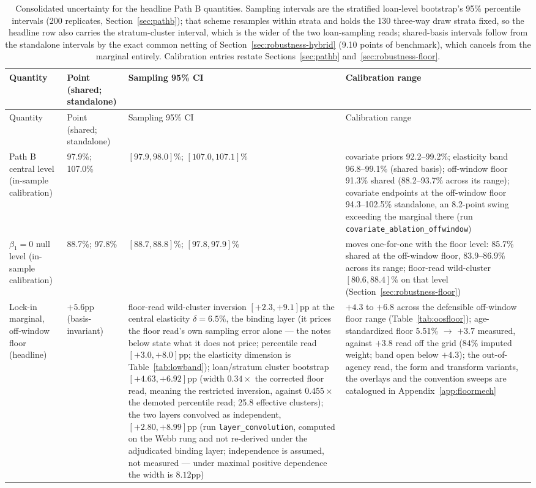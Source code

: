 {\footnotesize
\begin{longtable}{@{}p{2.4cm}p{3.3cm}p{4.0cm}p{4.8cm}@{}}
\caption{Consolidated uncertainty for the headline Path B quantities. Sampling intervals are the stratified loan-level bootstrap's 95\% percentile intervals (200 replicates, Section~\ref{sec:pathb}); that scheme resamples within strata and holds the 130 three-way draw strata fixed, so the headline row also carries the stratum-cluster interval, which is the wider of the two loan-sampling reads; shared-basis intervals follow from the standalone intervals by the exact common netting of Section~\ref{sec:robustness-hybrid} (9.10 points of benchmark), which cancels from the marginal entirely. Calibration entries restate Sections~\ref{sec:pathb} and~\ref{sec:robustness-floor}.}
\label{tab:uncertainty}\\
\toprule
Quantity & Point (shared; standalone) & Sampling 95\% CI & Calibration range \\
\midrule
\endfirsthead
\toprule
Quantity & Point (shared; standalone) & Sampling 95\% CI & Calibration range \\
\midrule
\endhead
Path B central level (in-sample calibration) & 97.9\%; 107.0\% & $[97.9, 98.0]$\%; $[107.0, 107.1]$\% & covariate priors 92.2--99.2\%; elasticity band 96.8--99.1\% (shared basis); off-window floor 91.3\% shared (88.2--93.7\% across its range); covariate endpoints at the off-window floor 94.3--102.5\% standalone, an 8.2-point swing exceeding the marginal there (run \texttt{covariate\_ablation\_offwindow}) \\
$\beta_1 = 0$ null level (in-sample calibration) & 88.7\%; 97.8\% & $[88.7, 88.8]$\%; $[97.8, 97.9]$\% & moves one-for-one with the floor level: 85.7\% shared at the off-window floor, 83.9--86.9\% across its range; floor-read wild-cluster $[80.6, 88.4]\%$ on that level (Section~\ref{sec:robustness-floor}) \\
Lock-in marginal, off-window floor (headline) & $+5.6$pp (basis-invariant) & floor-read wild-cluster inversion $[+2.3, +9.1]$pp at the central elasticity $\delta = 6.5\%$, the binding layer (it prices the floor read's own sampling error alone --- the notes below state what it does not price; percentile read $[+3.0, +8.0]$pp; the elasticity dimension is Table~\ref{tab:lowband}); loan/stratum cluster bootstrap $[+4.63, +6.92]$pp (width $0.34\times$ the corrected floor read, meaning the restricted inversion, against $0.455\times$ the demoted percentile read; 25.8 effective clusters); the two layers convolved as independent, $[+2.80, +8.99]$pp (run \texttt{layer\_convolution}, computed on the Webb rung and not re-derived under the adjudicated binding layer; independence is assumed, not measured --- under maximal positive dependence the width is $8.12$pp) & $+4.3$ to $+6.8$ across the defensible off-window floor range (Table~\ref{tab:oosfloor}); age-standardized floor 5.51\% $\to$ $+3.7$ measured, against $+3.8$ read off the grid (84\% imputed weight; band open below $+4.3$); the out-of-agency read, the form and transform variants, the overlays and the convention sweeps are catalogued in Appendix~\ref{app:floormech} \\

\end{longtable}}
